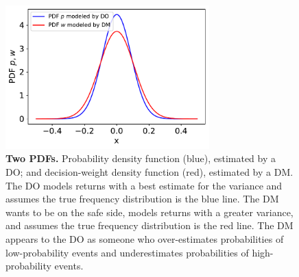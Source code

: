\documentclass[a4paper, 12pt]{article}
\newcommand{\flabel}[1]{\label{fig:#1}}
\newcommand{\Secref}[1]{Section~\ref{sec:#1}}
\newcommand{\ND}{\mathcal{N}} %
\begin{document}
\begin{figure}[htb]
\centering
\includegraphics[width=0.7\textwidth]{./figs/probability_dists.pdf}
\caption{{\bf Two PDFs.} Probability density function (blue), estimated by a DO; and decision-weight density function (red), estimated by a DM. The DO models returns with a best estimate for the variance and assumes the true frequency distribution is the blue line. The DM wants to be on the safe side, models returns with a greater variance, and assumes the true frequency distribution is the red line. The DM appears to the DO as someone who over-estimates probabilities of low-probability events and underestimates probabilities of high-probability events.}
\flabel{probability_dists}
\end{figure}
%
%
%
\end{document}
